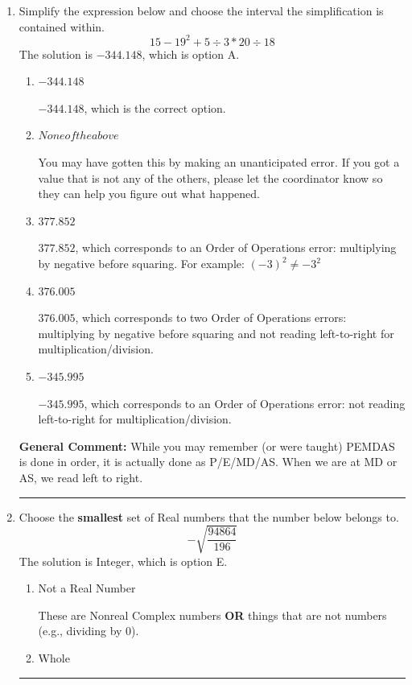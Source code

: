 \documentclass{extbook}[14pt]
\newcommand{\litem}[1]{\item #1

\rule{\textwidth}{0.4pt}}
\begin{document}
\begin{enumerate}
{\begin{enumerate}[label=\Alph*.]
$-70  - 86 i$, which corresponds to adding a minus sign in the second term.
\end{enumerate}

\textbf{General Comment:} You can treat $i$ as a variable and distribute. Just remember that $i^2=-1$, so you can continue to reduce after you distribute.
}
\litem{
Simplify the expression below and choose the interval the simplification is contained within.
\[ 15 - 19^2 + 5 \div 3 * 20 \div 18 \]The solution is \( -344.148 \), which is option A.\begin{enumerate}[label=\Alph*.]
\item \( -344.148 \)

$-344.148$, which is the correct option.
\item \( None of the above \)

 You may have gotten this by making an unanticipated error. If you got a value that is not any of the others, please let the coordinator know so they can help you figure out what happened.
\item \( 377.852 \)

$377.852$, which corresponds to an Order of Operations error: multiplying by negative before squaring. For example: $(-3)^2 \neq -3^2$
\item \( 376.005 \)

$376.005$, which corresponds to two Order of Operations errors: multiplying by negative before squaring and not reading left-to-right for multiplication/division.
\item \( -345.995 \)

$-345.995$, which corresponds to an Order of Operations error: not reading left-to-right for multiplication/division.
\end{enumerate}

\textbf{General Comment:} While you may remember (or were taught) PEMDAS is done in order, it is actually done as P/E/MD/AS. When we are at MD or AS, we read left to right.
}
\litem{
Choose the \textbf{smallest} set of Real numbers that the number below belongs to.
\[ -\sqrt{\frac{94864}{196}} \]The solution is Integer, which is option E.

\begin{enumerate}[label=\Alph*.]
\item Not a Real Number

These are Nonreal Complex numbers \textbf{OR} things that are not numbers (e.g., dividing by 0).
\item Whole


\end{enumerate}}
\end{enumerate}
\end{document}
